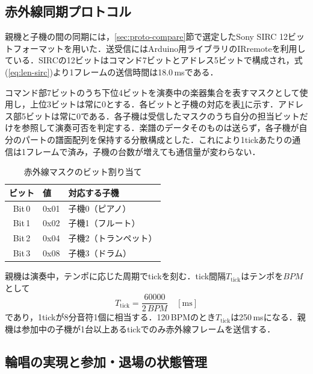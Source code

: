 \documentclass[uplatex,dvipdfmx]{jlreq}
\begin{document}
\subsection{赤外線同期プロトコル}

親機と子機の間の同期には，\ref{sec:proto-compare}節で選定したSony SIRC 12ビットフォーマット\cite{sircfmt}を用いた．送受信にはArduino用ライブラリのIRremote\cite{irremote}を利用している．SIRCの12ビットはコマンド7ビットとアドレス5ビットで構成され，式(\ref{eq:len-sirc})より1フレームの送信時間は18.0\,msである．

コマンド部7ビットのうち下位4ビットを演奏中の楽器集合を表すマスクとして使用し，上位3ビットは常に0とする．各ビットと子機の対応を表\ref{tab:ir-mask}に示す．アドレス部5ビットは常に0である．各子機は受信したマスクのうち自分の担当ビットだけを参照して演奏可否を判定する．楽譜のデータそのものは送らず，各子機が自分のパートの譜面配列を保持する分散構成とした．これにより1tickあたりの通信は1フレームで済み，子機の台数が増えても通信量が変わらない．

\begin{table}[tb]
\caption{赤外線マスクのビット割り当て}
\label{tab:ir-mask}
\begin{center}
\small
\begin{tabular}{cll}
\hline
ビット & 値 & 対応する子機 \\
\hline
Bit\,0 & 0x01 & 子機0（ピアノ） \\
Bit\,1 & 0x02 & 子機1（フルート） \\
Bit\,2 & 0x04 & 子機2（トランペット） \\
Bit\,3 & 0x08 & 子機3（ドラム） \\
\hline
\end{tabular}
\end{center}
\end{table}

親機は演奏中，テンポに応じた周期でtickを刻む．tick間隔$T_\mathrm{tick}$はテンポを$\mathit{BPM}$として
\begin{equation}
T_\mathrm{tick} = \frac{60000}{2\,\mathit{BPM}} \quad [\mathrm{ms}]
\label{eq:tick}
\end{equation}
であり，1tickが8分音符1個に相当する．120\,BPMのとき$T_\mathrm{tick}$は250\,msになる．親機は参加中の子機が1台以上あるtickでのみ赤外線フレームを送信する．

\subsection{輪唱の実現と参加・退場の状態管理}
\end{document}
